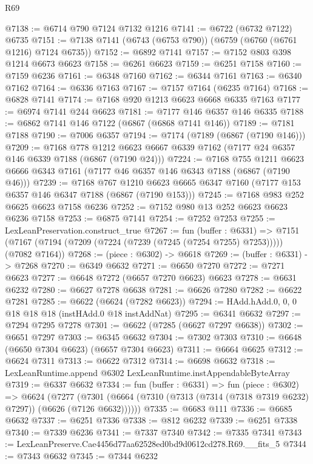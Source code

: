 \begin{lexlean}{R69}
\begin{coremodule}
{@7138 := @6714 @790 @7124 @7132 @1216
@7141 := @6722 (@6732 @7122) @6735
@7151 := @7138 @7141 (@6743 (@6753 @790)) (@6759 (@6760 (@6761 @1216) @7124 @6735))
@7152 := @6892 @7141
@7157 := @7152 @803 @398 @1214 @6673 @6623
@7158 := @6261 @6623
@7159 := @6251 @7158
@7160 := @7159 @6236
@7161 := @6348 @7160
@7162 := @6344 @7161
@7163 := @6340 @7162
@7164 := @6336 @7163
@7167 := @7157 @7164 (@6235 @7164)
@7168 := @6828 @7141
@7174 := @7168 @920 @1213 @6623 @6668 @6335 @7163
@7177 := @6974 @7141 @244 @6623
@7181 := @7177 @146 @6357 @146 @6335
@7188 := @6862 @7141 @146 @7122 (@6867 (@6868 @7141 @146))
@7189 := @7181 @7188
@7190 := @7006 @6357
@7194 := @7174 (@7189 (@6867 (@7190 @146)))
@7209 := @7168
    @778
    @1212
    @6623
    @6667
    @6339
    @7162
    (@7177 @24 @6357 @146 @6339 @7188 (@6867 (@7190 @24)))
@7224 := @7168
    @755
    @1211
    @6623
    @6666
    @6343
    @7161
    (@7177 @46 @6357 @146 @6343 @7188 (@6867 (@7190 @46)))
@7239 := @7168
    @767
    @1210
    @6623
    @6665
    @6347
    @7160
    (@7177 @153 @6357 @146 @6347 @7188 (@6867 (@7190 @153)))
@7245 := @7168 @983 @252 @6625 @6623 @7158 @6236
@7252 := @7152 @980 @13 @252 @6623 @6623 @6236 @7158
@7253 := @6875 @7141
@7254 := @7252 @7253
@7255 := LexLeanPreservation.construct_true
@7267 := fun (buffer : @6331) =>
  @7151 (@7167 (@7194 (@7209 (@7224 (@7239 (@7245 (@7254 @7255) @7253))))) (@7082 @7164))
@7268 := (piece : @6302) -> @6618
@7269 := (buffer : @6331) -> @7268
@7270 := @6349 @6632
@7271 := @6650 @7270
@7272 := @7271 @6623
@7277 := @6648 @7272 (@6657 @7270 @6623) @6623
@7278 := @6631 @6232
@7280 := @6627 @7278 @6638
@7281 := @6626 @7280
@7282 := @6622 @7281
@7285 := @6622 (@6624 (@7282 @6623))
@7294 := HAdd.hAdd.{0, 0, 0} @18 @18 @18 (instHAdd.{0} @18 instAddNat)
@7295 := @6341 @6632
@7297 := @7294 @7295 @7278
@7301 := @6622 (@7285 (@6627 @7297 @6638))
@7302 := @6651 @7297
@7303 := @6345 @6632
@7304 := @7302 @7303
@7310 := @6648 (@6650 @7304 @6623) (@6657 @7304 @6623)
@7311 := @6664 @6625
@7312 := @6624 @7311
@7313 := @6622 @7312
@7314 := @6698 @6632
@7318 := LexLeanRuntime.append @6302 LexLeanRuntime.instAppendableByteArray
@7319 := @6337 @6632
@7334 := fun (buffer : @6331) =>
  fun (piece : @6302) =>
  @6624
    (@7277 (@7301 (@6664 (@7310 (@7313 (@7314 (@7318 @7319 @6232) @7297)) (@6626 (@7126 @6632))))))
@7335 := @6683 @111
@7336 := @6685 @6632
@7337 := @6251 @7336
@7338 := @812 @6232
@7339 := @6251 @7338
@7340 := @7339 @6236
@7341 := @7337 @7340
@7342 := @7335 @7341
@7343 := LexLeanPreserve.Cae4456d77aa62528ed0bd9d0612cd278.R69.__fits_5
@7344 := @7343 @6632
@7345 := @7344 @6232
}
\end{coremodule}
\end{lexlean}
